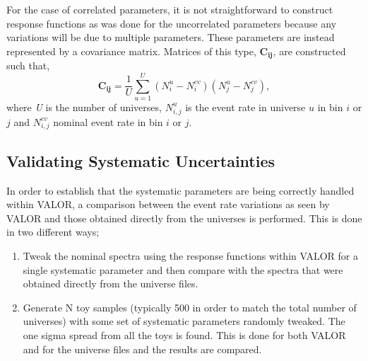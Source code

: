 For the case of correlated parameters, it is not straightforward to construct response functions as was done for the uncorrelated parameters because any variations will be due to multiple parameters. These parameters are instead represented by a covariance matrix. Matrices of this type, $\mathbf{C_{ij}}$, are constructed such that,
\begin{equation}
  \mathbf{C_{ij}} = \frac{1}{U} \sum_{u=1}^{U} (N_{i}^{u}-N_{i}^{cv})(N_{j}^{u}-N_{j}^{cv}),
  \label{eq:covmatrix}
\end{equation}
where \textit{U} is the number of universes, $N_{i,j}^{u}$ is the event rate in universe $u$ in bin $i$ or $j$ and $N_{i,j}^{cv}$ nominal event rate in
bin $i$ or $j$.

\subsection{Validating Systematic Uncertainties}
In order to establish that the systematic parameters are being correctly handled within VALOR, a comparison between the event rate variations as seen by VALOR and those obtained directly from the universes is performed. This is done in two different ways; 
\begin{enumerate}
    \item Tweak the nominal spectra using the response functions within VALOR for a single systematic parameter and then compare with the spectra that were obtained directly from the universe files.
    \item Generate N toy samples (typically 500 in order to match the total number of universes) with some set of systematic parameters randomly tweaked. The one sigma spread from all the toys is found. This is done for both VALOR and for the universe files and the results are compared. 
\end{enumerate}

